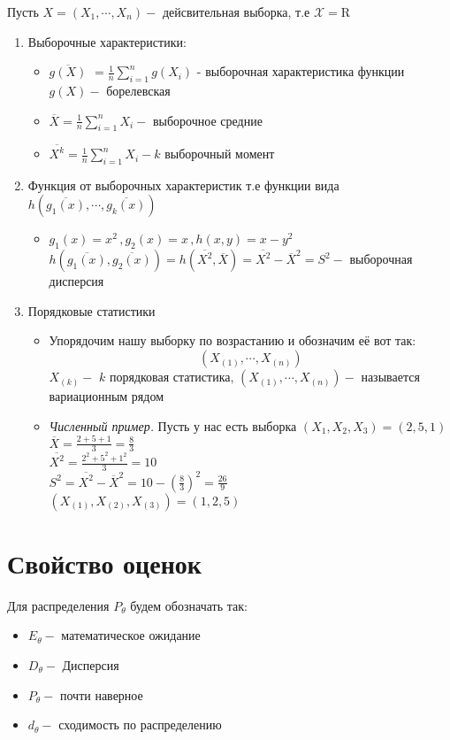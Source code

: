 \documentclass[11pt,fleqn]{book} %
\begin{document}
\begin{exa}
Пусть $X = (X_1, \cdots , X_n) - $ дейсвительная выборка, т.е $\mathcal{X} = \mathrm{R}$ 
\begin{enumerate}
\item Выборочные характеристики: 
\begin{itemize}
\item $ \overline{g(X)}$ $ = \frac{1}{n} \sum_{i=1}^{n} g(X_i)$ - выборочная характеристика функции $g(X) - $ борелевская 
\item $\overline{X} = \frac{1}{n} \sum_{i=1}^n X_i - $  выборочное средние
\item $\overline{X^k} = \frac{1}{n}\sum_{i=1}^n X_i - k $ выборочный момент 
\end{itemize}
\item Функция от выборочных характеристик т.е функции вида $h(\overline{g_1(x)}, \cdots , \overline{g_k(x)})$
\begin{itemize}
\item $g_1(x) = x^2\,, g_2(x) = x\,, h(x,y) = x - y^2$\\ $h(\overline{g_1(x)},\overline{g_2(x)}) = h(\overline{X^2}, \overline{X}) = \overline{X^2} - \overline{X}^2 = S^2 - $ выборочная дисперсия 
\end{itemize}
\item Порядковые статистики 
\begin{itemize}
\item Упорядочим нашу выборку по возрастанию и обозначим её вот так: $$(X_{(1)}, \cdots , X_{(n)})$$ $X_{(k)} - $ $k$ порядковая статистика, $(X_{(1)}, \cdots , X_{(n)}) - $ называется вариационным рядом 
\item \textit{Численный пример.} Пусть у нас есть выборка $(X_1, X_2, X_3) = (2, 5, 1)$\\ $\overline{X} = \frac{2+5+1}{3} = \frac{8}{3}$ \\ $\overline{X^2} = \frac{2^2+ 5^2 + 1^2}{3} = 10$ \\ $S^2 = \overline{X^2} - \overline{X}^2 = 10 - (\frac{8}{3})^2 = \frac{26}{9}$ \\$(X_{(1)}, X_{(2)} , X_{(3)}) = (1,2,5)$
\end{itemize}
\end{enumerate}
\end{exa}
\section{Свойство оценок}
\begin{remark}
Для распределения $P_\theta$ будем обозначать так:
\begin{itemize}
\item $E_\theta - $ математическое ожидание
\item $D_\theta - $ Дисперсия
\item $P_\theta - $ почти наверное 
\item $d_\theta - $ сходимость по распределению
\end{itemize}
\end{remark}
\end{document}
